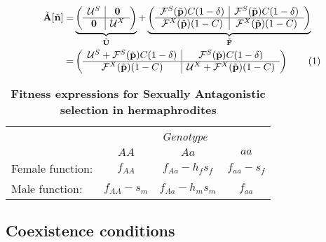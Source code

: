 \documentclass[11pt]{article}
\newcommand\numberthis{\addtocounter{equation}{1}\tag{\theequation}}
\def\mbf#1{\mathbf{#1}}
\def\mcal#1{\mathcal{#1}}
\begin{document}
\begin{align*}
	\tilde{\mbf{A}}[\tilde{\mbf{n}}] = 
			&\underbrace{\left(
			\begin{array}{c|c}
				\mcal{U}^S & \mbf{0} \\ \hline
				\mbf{0} & \mcal{U}^X \\
			\end{array} \right)}_{\tilde{\mbf{U}}} + 
			\underbrace{\left(
			\begin{array}{c|c}
				\mcal{F}^S(\tilde{\mbf{p}}) C(1 - \delta) & \mcal{F}^S(\tilde{\mbf{p}}) C(1 - \delta) \\ \hline
				\mcal{F}^X(\tilde{\mbf{p}}) (1 - C) & \mcal{F}^X(\tilde{\mbf{p}}) (1 - C)\\
			\end{array} \right)}_{\tilde{\mbf{F}}} \\
			= & \left(\begin{array}{c|c}
				\mcal{U}^S + \mcal{F}^S(\tilde{\mbf{p}}) C(1 - \delta) & \mcal{F}^S(\tilde{\mbf{p}}) C(1 - \delta) \\ \hline
				\mcal{F}^X(\tilde{\mbf{p}})(1 - C) & \mcal{U}^X + \mcal{F}^X(\tilde{\mbf{p}}) (1 - C)
			\end{array} \right) \numberthis
\end{align*}




\begin{table}[htbp]
 \centering
 \caption{\bf Fitness expressions for Sexually Antagonistic selection in hermaphrodites}
\begin{tabular}{lccc}
 \toprule
					&  \multicolumn{3}{c}{{\textit{Genotype}}} \\ 
\cline{2-4}
					& $AA$			& $Aa$ 					& $aa$ 		\\ \hline
Female function:	& $f_{AA}$		& $f_{Aa} - h_f s_f$	& $f_{aa} - s_f$ \\	
Male function:		& $f_{AA} - s_m$& $f_{Aa} - h_m s_m$	& $f_{aa}$ 		\\	
\hline
\end{tabular}
\end{table}



\newpage
\subsection*{Coexistence conditions}
\setcounter{equation}{0}
\end{document}
